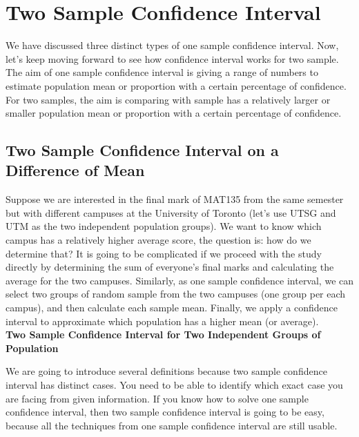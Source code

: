 \setcounter{chapter}{9}
\chapter{Two Sample Confidence Interval}

We have discussed three distinct types of one sample confidence interval. Now, let's keep moving forward to see how confidence interval works for two sample. The aim of one sample confidence interval is giving a range of numbers to estimate population mean or proportion with a certain percentage of confidence. For two samples, the aim is comparing with sample has a relatively larger or smaller population mean or proportion with a certain percentage of confidence.

\section{Two Sample Confidence Interval on a Difference of Mean}

Suppose we are interested in the final mark of MAT135 from the same semester but with different campuses at the University of Toronto (let's use UTSG and UTM as the two independent population groups). We want to know which campus has a relatively higher average score, the question is: how do we determine that? It is going to be complicated if we proceed with the study directly by determining the sum of everyone's final marks and calculating the average for the two campuses. Similarly, as one sample confidence interval, we can select two groups of random sample from the two campuses (one group per each campus), and then calculate each sample mean. Finally, we apply a confidence interval to approximate which population has a higher mean (or average).\\

\textbf{Two Sample Confidence Interval for Two Independent Groups of Population}

We are going to introduce several definitions because two sample confidence interval has distinct cases. You need to be able to identify which exact case you are facing from given information. If you know how to solve one sample confidence interval, then two sample confidence interval is going to be easy, because all the techniques from one sample confidence interval are still usable.\\


